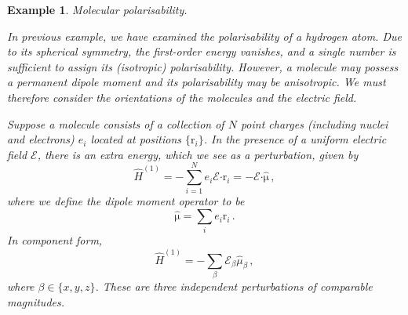 \documentclass{article}
\theoremstyle{plain}\theoremheaderfont{\normalfont\itshape}\theorembodyfont{\rmfamily}\theoremseparator{.}\newtheorem*{rem}{Remark}\newtheorem*{ex}{Example}\newtheorem*{proof}{Proof}\newtheorem*{altp}{Alternative proof}
\theoremstyle{plain}\theoremheaderfont{\normalfont\bfseries}\theorembodyfont{\rmfamily}\theoremseparator{.}\newtheorem{thm}{Theorem}[section]\newtheorem{lem}[thm]{Lemma}\newtheorem{prop}[thm]{Proposition}\newtheorem*{cor}{Corollary}\newtheorem{defn}[thm]{Definition}\newtheorem{clm}[thm]{Claim}\newtheorem{clminproof}{Claim}
\theoremstyle{break}\theoremheaderfont{\normalfont\itshape}\theorembodyfont{\rmfamily}\theoremseparator{.\medskip}\newtheorem*{proofskip}{Proof}\newtheorem*{exs}{Examples}\newtheorem*{rems}{Remarks}
\theoremstyle{break}\theoremheaderfont{\normalfont\bfseries}\theorembodyfont{\rmfamily}\theoremseparator{.\medskip}\newtheorem{lemskip}[thm]{Lemma}\newtheorem{defnskip}[thm]{Definition}\newtheorem{propskip}[thm]{Proposition}\newtheorem{thmskip}[thm]{Theorem}
\numberwithin{equation}{section}
\newcommand{\vb}[1]{\bm{\mathrm{#1}}}
\newcommand{\vdot}{\bm{\cdot}}
\begin{document}
    \begin{ex}
        \textit{Molecular polarisability.}

        In previous example, we have examined the polarisability of a hydrogen atom. Due to its spherical symmetry, the first-order energy vanishes, and a single number is sufficient to assign its (isotropic) polarisability. However, a molecule may possess a permanent dipole moment and its polarisability may be anisotropic. We must therefore consider the orientations of the molecules and the electric field.

        Suppose a molecule consists of a collection of \(N\) point charges (including nuclei and electrons) \(e_i\) located at positions \(\{\vb{r}_i\}\). In the presence of a uniform electric field \(\vb{\mathcal{E}}\), there is an extra energy, which we see as a perturbation, given by
        \begin{equation}
            \hat{H}^{(1)}=-\sum_{i=1}^{N}e_i\vb{\mathcal{E}}\vdot\vb{r}_i=-\vb{\mathcal{E}}\vdot\hat{\vb{\mu}}\,,
        \end{equation}
        where we define the \textit{dipole moment operator} to be
        \begin{equation}
            \hat{\vb{\mu}}=\sum_i e_i\vb{r}_i\,.
        \end{equation}
        In component form,
        \begin{equation}
            \hat{H}^{(1)}=-\sum_\beta \mathcal{E}_\beta\hat{\mu}_\beta\,,
        \end{equation}
        where \(\beta\in\{x,y,z\}\). These are three independent perturbations of comparable magnitudes.


\end{ex}
\end{document}
